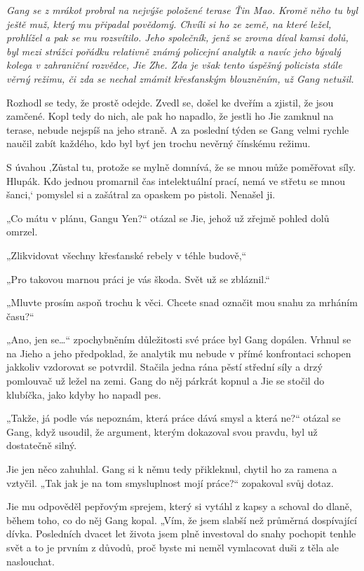 {\itshape
Gang se z mrákot probral na nejvýše položené terase Ťin Mao. Kromě něho tu byl ještě muž, který mu připadal povědomý. Chvíli si ho ze země, na které ležel, prohlížel a pak se mu rozsvítilo. Jeho společník, jenž se zrovna díval kamsi dolů, byl mezi strážci pořádku relativně známý policejní analytik a navíc jeho bývalý kolega v zahraniční rozvědce, Jie Zhe. Zda je však tento úspěšný policista stále věrný režimu, či zda se nechal zmámit křesťanským blouzněním, už Gang netušil.

Rozhodl se tedy, že prostě odejde. Zvedl se, došel ke dveřím a zjistil, že jsou zamčené. Kopl tedy do nich, ale pak ho napadlo, že jestli ho Jie zamknul na terase, nebude nejspíš na jeho straně. A za poslední týden se Gang velmi rychle naučil zabít každého, kdo byl byť jen trochu nevěrný čínskému režimu.

S úvahou ‚Zůstal tu, protože se mylně domnívá, že se mnou může poměřovat síly. Hlupák. Kdo jednou promarnil čas intelektuální prací, nemá ve střetu se mnou šanci,‘ pomyslel si a zašátral za opaskem po pistoli. Nenašel ji.

„Co mátu v plánu, Gangu Yen?“ otázal se Jie, jehož už zřejmě pohled dolů omrzel.

„Zlikvidovat všechny křesťanské rebely v téhle budově,“

„Pro takovou marnou práci je vás škoda. Svět už se zbláznil.“

„Mluvte prosím aspoň trochu k věci. Chcete snad označit mou snahu za mrháním času?“

„Ano, jen se…“ zpochybněním důležitosti své práce byl Gang dopálen. Vrhnul se na Jieho a jeho předpoklad, že analytik mu nebude v přímé konfrontaci schopen jakkoliv vzdorovat se potvrdil. Stačila jedna rána pěstí střední síly a drzý pomlouvač už ležel na zemi. Gang do něj párkrát kopnul a Jie se stočil do klubíčka, jako kdyby ho napadl pes. 

„Takže, já podle vás nepoznám, která práce dává smysl a která ne?“ otázal se Gang, když usoudil, že argument, kterým dokazoval svou pravdu, byl už dostatečně silný.

Jie jen něco zahuhlal. Gang si k němu tedy přikleknul, chytil ho za ramena a vztyčil. „Tak jak je na tom smysluplnost mojí práce?“ zopakoval svůj dotaz.

Jie mu odpověděl pepřovým sprejem, který si vytáhl z kapsy a schoval do dlaně, během toho, co do něj Gang kopal.
„Vím, že jsem slabší než průměrná dospívající dívka. Posledních dvacet let života jsem plně investoval do snahy pochopit tenhle svět a to je prvním z důvodů, proč byste mi neměl vymlacovat duši z těla ale naslouchat.

}
